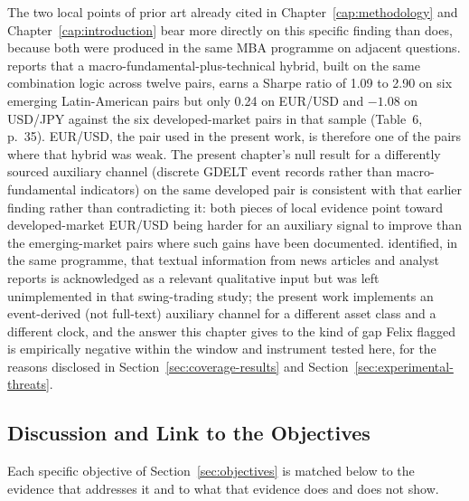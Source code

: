 The two local points of prior art already cited in Chapter~\ref{cap:methodology} and Chapter~\ref{cap:introduction} bear more directly on this specific finding than  does, because both were produced in the same MBA programme on adjacent questions.  reports that a macro-fundamental-plus-technical hybrid, built on the same combination logic across twelve pairs, earns a Sharpe ratio of 1.09 to 2.90 on six emerging Latin-American pairs but only 0.24 on EUR/USD and $-1.08$ on USD/JPY against the six developed-market pairs in that sample (Table~6, p.~35). EUR/USD, the pair used in the present work, is therefore one of the pairs where that hybrid was weak. The present chapter's null result for a differently sourced auxiliary channel (discrete GDELT event records rather than macro-fundamental indicators) on the same developed pair is consistent with that earlier finding rather than contradicting it: both pieces of local evidence point toward developed-market EUR/USD being harder for an auxiliary signal to improve than the emerging-market pairs where such gains have been documented.  identified, in the same programme, that textual information from news articles and analyst reports is acknowledged as a relevant qualitative input but was left unimplemented in that swing-trading study; the present work implements an event-derived (not full-text) auxiliary channel for a different asset class and a different clock, and the answer this chapter gives to the kind of gap Felix flagged is empirically negative within the window and instrument tested here, for the reasons disclosed in Section~\ref{sec:coverage-results} and Section~\ref{sec:experimental-threats}.

\subsection{Discussion and Link to the Objectives} \label{subsec:objectives-discussion}

Each specific objective of Section~\ref{sec:objectives} is matched below to the evidence that addresses it and to what that evidence does and does not show.

